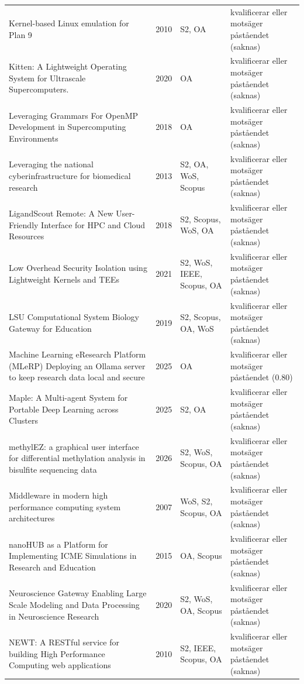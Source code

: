 \begin{longtable}{@{}%
  >{\raggedright\arraybackslash}p{}c%
  >{\raggedright\arraybackslash}p{}%
  >{\raggedright\arraybackslash}p{}@{}}
Kernel-based Linux emulation for Plan 9 & 2010 & S2, OA & kvalificerar eller motsäger påståendet (saknas) \\
Kitten: A Lightweight Operating System for Ultrascale Supercomputers. & 2020 & OA & kvalificerar eller motsäger påståendet (saknas) \\
Leveraging Grammars For OpenMP Development in Supercomputing Environments & 2018 & OA & kvalificerar eller motsäger påståendet (saknas) \\
Leveraging the national cyberinfrastructure for biomedical research & 2013 & S2, OA, WoS, Scopus & kvalificerar eller motsäger påståendet (saknas) \\
LigandScout Remote: A New User-Friendly Interface for HPC and Cloud Resources & 2018 & S2, Scopus, WoS, OA & kvalificerar eller motsäger påståendet (saknas) \\
Low Overhead Security Isolation using Lightweight Kernels and TEEs & 2021 & S2, WoS, IEEE, Scopus, OA & kvalificerar eller motsäger påståendet (saknas) \\
LSU Computational System Biology Gateway for Education & 2019 & S2, Scopus, OA, WoS & kvalificerar eller motsäger påståendet (saknas) \\
Machine Learning eResearch Platform (MLeRP) Deploying an Ollama server to keep research data local and secure & 2025 & OA & kvalificerar eller motsäger påståendet (0.80) \\
Maple: A Multi-agent System for Portable Deep Learning across Clusters & 2025 & S2, OA & kvalificerar eller motsäger påståendet (saknas) \\
methylEZ: a graphical user interface for differential methylation analysis in bisulfite sequencing data & 2026 & S2, WoS, Scopus, OA & kvalificerar eller motsäger påståendet (saknas) \\
Middleware in modern high performance computing system architectures & 2007 & WoS, S2, Scopus, OA & kvalificerar eller motsäger påståendet (saknas) \\
nanoHUB as a Platform for Implementing ICME Simulations in Research and Education & 2015 & OA, Scopus & kvalificerar eller motsäger påståendet (saknas) \\
Neuroscience Gateway Enabling Large Scale Modeling and Data Processing in Neuroscience Research & 2020 & S2, WoS, OA, Scopus & kvalificerar eller motsäger påståendet (saknas) \\
NEWT: A RESTful service for building High Performance Computing web applications & 2010 & S2, IEEE, Scopus, OA & kvalificerar eller motsäger påståendet (saknas) \\

\end{longtable}
